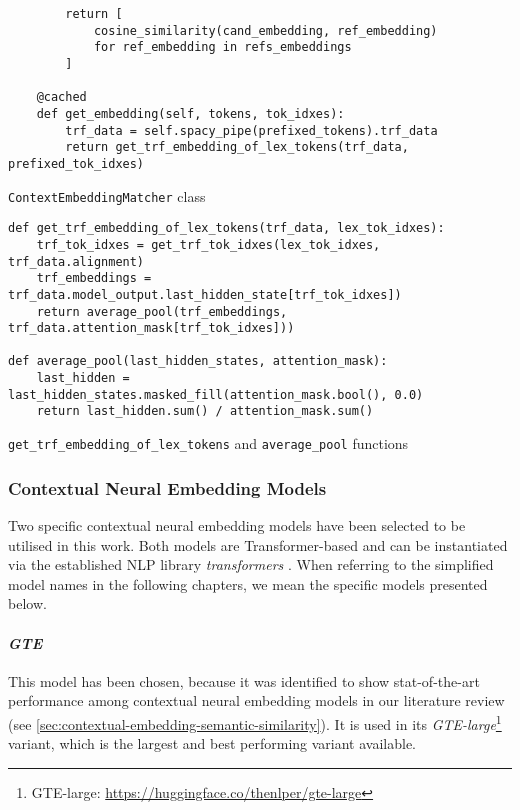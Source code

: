 \documentclass[11pt]{scrreprt}
\let\cite\parencite  %
\begin{document}
{\begin{pseudo}[p!]
\begin{lstlisting}
        return [
            cosine_similarity(cand_embedding, ref_embedding)
            for ref_embedding in refs_embeddings
        ]

    @cached
    def get_embedding(self, tokens, tok_idxes):
        trf_data = self.spacy_pipe(prefixed_tokens).trf_data
        return get_trf_embedding_of_lex_tokens(trf_data, prefixed_tok_idxes)
\end{lstlisting}
\caption{\texttt{ContextEmbeddingMatcher} class}
\label{psd:contextualmatcher-class}
\end{pseudo}


\begin{pseudo}[p!]
\begin{lstlisting}
def get_trf_embedding_of_lex_tokens(trf_data, lex_tok_idxes):
    trf_tok_idxes = get_trf_tok_idxes(lex_tok_idxes, trf_data.alignment)
    trf_embeddings = trf_data.model_output.last_hidden_state[trf_tok_idxes])
    return average_pool(trf_embeddings, trf_data.attention_mask[trf_tok_idxes]))

def average_pool(last_hidden_states, attention_mask):
    last_hidden = last_hidden_states.masked_fill(attention_mask.bool(), 0.0)
    return last_hidden.sum() / attention_mask.sum()
\end{lstlisting}
\caption{\texttt{get\_trf\_embedding\_of\_lex\_tokens} and \texttt{average\_pool} functions}
\label{psd:get-mebedding-subfunction}
\end{pseudo}



\subsubsection{Contextual Neural Embedding Models}
Two specific contextual neural embedding models have been selected to be utilised in this work. Both models are Transformer-based and can be instantiated via the established NLP library \textit{transformers} \cite{wolfTransformersStateoftheArtNatural2020}. When referring to the simplified model names in the following chapters, we mean the specific models presented below.

\paragraph{\textit{GTE}} This model has been chosen, because it was identified to show stat-of-the-art performance among contextual neural embedding models in our literature review (see \cref{sec:contextual-embedding-semantic-similarity}). It is used in its \textit{GTE-large}\footnote{GTE-large: \url{https://huggingface.co/thenlper/gte-large}} variant, which is the largest and best performing variant available.

}
\end{document}
